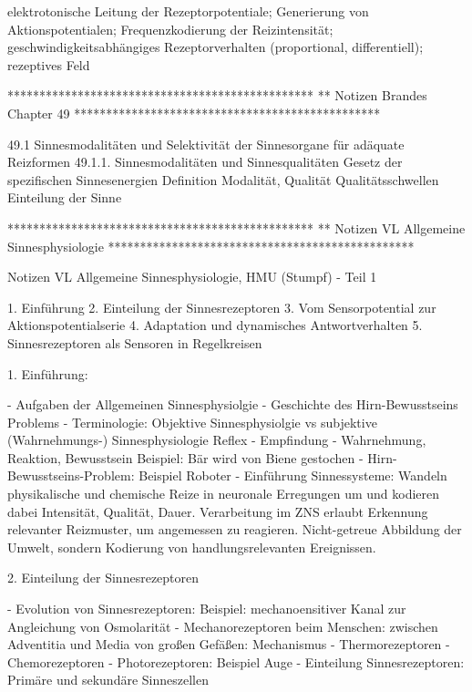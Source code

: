         elektrotonische Leitung der Rezeptorpotentiale; Generierung von Aktionspotentialen; Frequenzkodierung der Reizintensität; geschwindigkeitsabhängiges Rezeptorverhalten (proportional, differentiell); rezeptives Feld
        
        



************************************************
** Notizen Brandes Chapter 49
************************************************

49.1 Sinnesmodalitäten und Selektivität der Sinnesorgane für adäquate Reizformen
    49.1.1. Sinnesmodalitäten und Sinnesqualitäten
        Gesetz der spezifischen Sinnesenergien
            Definition Modalität, Qualität
        Qualitätsschwellen
        Einteilung der Sinne
        


************************************************
** Notizen VL Allgemeine Sinnesphysiologie
************************************************

Notizen VL Allgemeine Sinnesphysiologie, HMU (Stumpf) - Teil 1

1. Einführung
2. Einteilung der Sinnesrezeptoren
3. Vom Sensorpotential zur Aktionspotentialserie
4. Adaptation und dynamisches Antwortverhalten
5. Sinnesrezeptoren als Sensoren in Regelkreisen


1. Einführung: 

- Aufgaben der Allgemeinen Sinnesphysiolgie
- Geschichte des Hirn-Bewusstseins Problems
- Terminologie: Objektive Sinnesphysiolgie vs subjektive (Wahrnehmungs-) Sinnesphysiologie
    Reflex - Empfindung - Wahrnehmung, Reaktion, Bewusstsein
    Beispiel: Bär wird von Biene gestochen
- Hirn-Bewusstseins-Problem: Beispiel Roboter
- Einführung Sinnessysteme: 
    Wandeln physikalische und chemische Reize in neuronale Erregungen um und kodieren dabei Intensität, Qualität, Dauer. 
    Verarbeitung im ZNS erlaubt Erkennung relevanter Reizmuster, um angemessen zu reagieren. 
    Nicht-getreue Abbildung der Umwelt, sondern Kodierung von handlungsrelevanten Ereignissen. 
  
    
2. Einteilung der Sinnesrezeptoren

- Evolution von Sinnesrezeptoren: 
    Beispiel: mechanoensitiver Kanal zur Angleichung von Osmolarität
- Mechanorezeptoren beim Menschen: zwischen Adventitia und Media von großen Gefäßen: Mechanismus
- Thermorezeptoren
- Chemorezeptoren
- Photorezeptoren: Beispiel Auge
- Einteilung Sinnesrezeptoren: Primäre und sekundäre Sinneszellen

